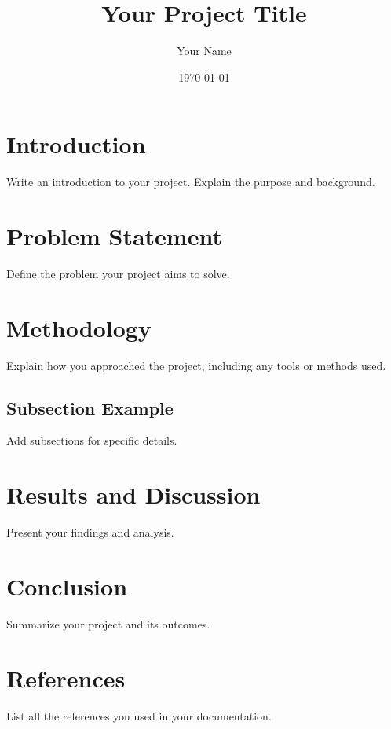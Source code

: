\documentclass[a4paper, 12pt]{article} %
\title{Your Project Title}
\author{Your Name}
\date{\today} %
\begin{document}
\maketitle %

\tableofcontents %
\newpage %

\section{Introduction}
Write an introduction to your project. Explain the purpose and background.

\section{Problem Statement}
Define the problem your project aims to solve.

\section{Methodology}
Explain how you approached the project, including any tools or methods used.

\subsection{Subsection Example}
Add subsections for specific details.

\section{Results and Discussion}
Present your findings and analysis.

\section{Conclusion}
Summarize your project and its outcomes.

\section{References}
List all the references you used in your documentation.
\end{document}
